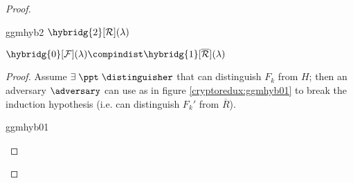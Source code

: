 \begin{proof}
\begin{cryptogame}
    \end{cryptogame}

    \begin{cryptogame}
        {ggmhyb2}
        {$\hybridg{2}[\R](\lambda)$}
        {}


    \end{cryptogame}
    

    \begin{lemma}
        $\hybridg{0}[\F](\lambda) \compindist \hybridg{1}[\overline{\R}](\lambda)$       
    \end{lemma}

    \begin{proof}
        Assume $\exists\; \ppt\; \distinguisher$ that can distinguish $F_k$ from $H$; then an adversary $\adversary$ can use \distinguisher{} as in figure \ref{cryptoredux:ggmhyb01} to break the induction hypothesis (i.e. can distinguish $F_k'$ from $\overline{R}$).

        \begin{cryptoredux}
            {ggmhyb01}
            {}
            {}
            {}







\end{cryptoredux}
\end{proof}
\end{proof}
